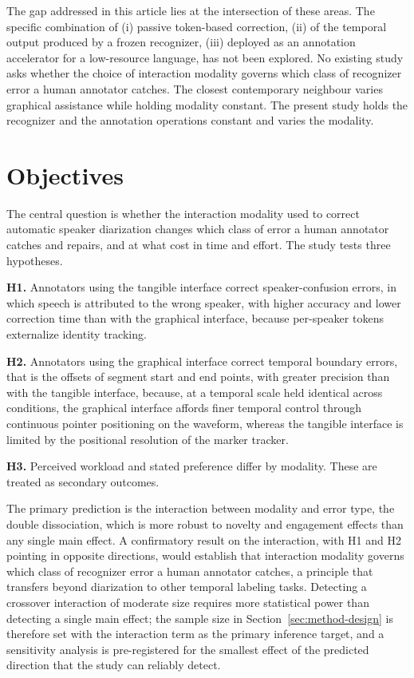 \documentclass[10pt,a4paper,twocolumn]{article}
\begin{document}
The gap addressed in this article lies at the intersection of
these areas. The specific combination of (i) passive token-based
correction, (ii) of the temporal output produced by a frozen
recognizer, (iii) deployed as an annotation accelerator for a
low-resource language, has not been explored. No existing study
asks whether the choice of interaction modality governs which
class of recognizer error a human annotator catches.
The closest contemporary neighbour
\citep{yamaguchi2026voxmap} varies graphical assistance while
holding modality constant. The present study holds the recognizer
and the annotation operations constant and varies the modality.

\section{Objectives}\label{sec:obj}

The central question is whether the interaction modality used to
correct automatic speaker diarization changes which class of error
a human annotator catches and repairs, and at what cost in time
and effort. The study tests three hypotheses.

\textbf{H1.} Annotators using the tangible interface correct
speaker-confusion errors, in which speech is attributed to the
wrong speaker, with higher accuracy and lower correction time than
with the graphical interface, because per-speaker tokens
externalize identity tracking.

\textbf{H2.} Annotators using the graphical interface correct
temporal boundary errors, that is the offsets of segment start
and end points, with greater precision than with the tangible
interface, because, at a temporal scale held identical across
conditions, the graphical interface affords finer temporal control
through continuous pointer positioning on the waveform, whereas the
tangible interface is limited by the positional resolution of the
marker tracker.

\textbf{H3.} Perceived workload and stated preference differ by
modality. These are treated as secondary outcomes.

The primary prediction is the interaction between modality and
error type, the double dissociation, which is more robust to
novelty and engagement effects than any single main effect. A
confirmatory result on the interaction, with H1 and H2 pointing in
opposite directions, would establish that interaction modality
governs which class of recognizer error a human annotator catches,
a principle that transfers beyond diarization to other temporal
labeling tasks. Detecting a crossover interaction of moderate
size requires more statistical power than detecting a single
main effect; the sample size in Section~\ref{sec:method-design}
is therefore set with the interaction term as the primary
inference target, and a sensitivity analysis is pre-registered
for the smallest effect of the predicted direction that the
study can reliably detect.
\end{document}
